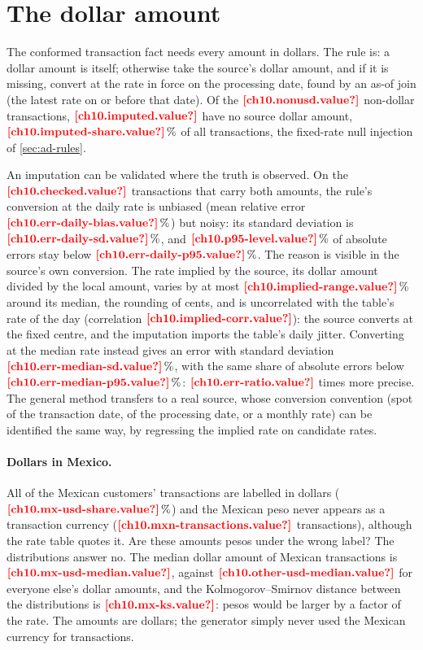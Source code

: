 \section{The dollar amount}\label{sec:cf-usd}

The conformed transaction fact needs every amount in dollars. The rule is: a dollar amount is itself; otherwise take the
source's dollar amount, and if it is missing, convert at the rate in force on the processing date, found by an as-of join
(the latest rate on or before that date). Of the $\est{ch10.nonusd}{value}$ non-dollar transactions,
$\est{ch10.imputed}{value}$ have no source dollar amount, $\est{ch10.imputed-share}{value}\,\%$ of all transactions, the
fixed-rate null injection of \cref{sec:ad-rules}.

An imputation can be validated where the truth is observed. On the $\est{ch10.checked}{value}$ transactions that carry
both amounts, the rule's conversion at the daily rate is unbiased (mean relative error $\est{ch10.err-daily-bias}{value}\,\%$)
but noisy: its standard deviation is $\est{ch10.err-daily-sd}{value}\,\%$, and $\est{ch10.p95-level}{value}\,\%$ of absolute errors stay
below $\est{ch10.err-daily-p95}{value}\,\%$. The reason is visible in the source's own conversion. The rate implied by the source,
its dollar amount divided by the local amount, varies by at most $\est{ch10.implied-range}{value}\,\%$ around its median, the
rounding of cents, and is uncorrelated with the table's rate of the day (correlation $\est{ch10.implied-corr}{value}$): the
source converts at the fixed centre, and the imputation imports the table's daily jitter. Converting at the median rate
instead gives an error with standard deviation $\est{ch10.err-median-sd}{value}\,\%$, with the same share of absolute errors below
$\est{ch10.err-median-p95}{value}\,\%$: $\est{ch10.err-ratio}{value}$ times more precise. The general method transfers to a
real source, whose conversion convention (spot of the transaction date, of the processing date, or a monthly rate) can
be identified the same way, by regressing the implied rate on candidate rates.

\paragraph{Dollars in Mexico.} All of the Mexican customers' transactions are labelled in dollars
($\est{ch10.mx-usd-share}{value}\,\%$) and the Mexican peso never appears as a transaction currency
($\est{ch10.mxn-transactions}{value}$ transactions), although the rate table quotes it. Are these amounts pesos under the
wrong label? The distributions answer no. The median dollar amount of Mexican transactions is $\est{ch10.mx-usd-median}{value}$,
against $\est{ch10.other-usd-median}{value}$ for everyone else's dollar amounts, and the Kolmogorov--Smirnov distance
between the distributions is $\est{ch10.mx-ks}{value}$: pesos would be larger by a factor of the rate. The amounts are
dollars; the generator simply never used the Mexican currency for transactions.


